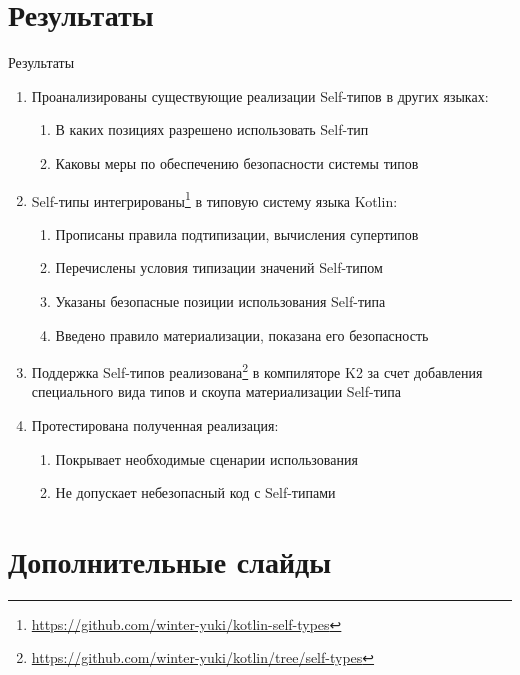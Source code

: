 \documentclass[aspectratio=169,usenames,dvipsnames]{beamer}
\begin{document}
    \section{Результаты}

    \begin{frame}{Результаты}
        \begin{enumerate}
            \item Проанализированы существующие реализации Self-типов в других языках:
            \begin{enumerate}
                \item В каких позициях разрешено использовать Self-тип
                \item Каковы меры по обеспечению безопасности системы типов
            \end{enumerate} \pause
            \item Self-типы интегрированы\footnote{\url{https://github.com/winter-yuki/kotlin-self-types}} в типовую систему языка Kotlin:
            \begin{enumerate}
                \item Прописаны правила подтипизации, вычисления супертипов
                \item Перечислены условия типизации значений Self-типом
                \item Указаны безопасные позиции использования Self-типа
                \item Введено правило материализации, показана его безопасность
            \end{enumerate} \pause
            \item Поддержка Self-типов реализована\footnote{\url{https://github.com/winter-yuki/kotlin/tree/self-types}} в компиляторе K2 за счет добавления специального вида типов и скоупа материализации Self-типа \pause
            \item Протестирована полученная реализация:
            \begin{enumerate}
                \item Покрывает необходимые сценарии использования
                \item Не допускает небезопасный код с Self-типами
            \end{enumerate}
        \end{enumerate}
    \end{frame}


    \appendix


    \section{Дополнительные слайды}
\end{document}
